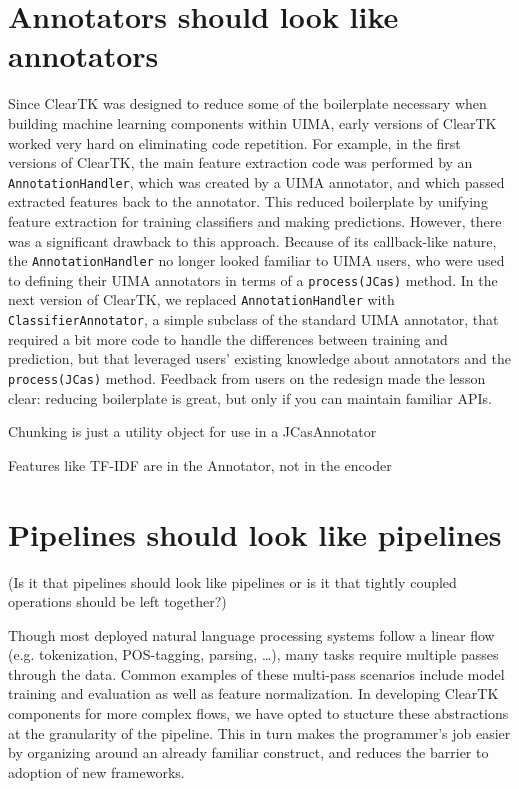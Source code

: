 \documentclass[10pt, a4paper]{article}
\begin{document}
\section{Annotators should look like annotators}
Since ClearTK was designed to reduce some of the boilerplate necessary when building machine learning components within UIMA, early versions of ClearTK worked very hard on eliminating code repetition.
For example, in the first versions of ClearTK, the main feature extraction code was performed by an \texttt{AnnotationHandler}, which was created by a UIMA annotator, and which passed extracted features back to the annotator.
This reduced boilerplate by unifying feature extraction for training classifiers and making predictions.
However, there was a significant drawback to this approach.
Because of its callback-like nature, the \texttt{AnnotationHandler} no longer looked familiar to UIMA users, who were used to defining their UIMA annotators in terms of a \texttt{process(JCas)} method.
In the next version of ClearTK, we replaced \texttt{AnnotationHandler} with \texttt{ClassifierAnnotator}, a simple subclass of the standard UIMA annotator, that required a bit more code to handle the differences between training and prediction, but that leveraged users' existing knowledge about annotators and the \texttt{process(JCas)} method.
Feedback from users on the redesign made the lesson clear: reducing boilerplate is great, but only if you can maintain familiar APIs.

Chunking is just a utility object for use in a JCasAnnotator

Features like TF-IDF are in the Annotator, not in the encoder


\section{Pipelines should look like pipelines}

(Is it that pipelines should look like pipelines or is it that tightly coupled operations should be left together?)

Though most deployed natural language processing systems follow a linear flow (e.g. tokenization, POS-tagging, parsing, \ldots), many tasks require multiple passes through the data.  Common examples of these multi-pass scenarios include model training and evaluation as well as feature normalization.  In developing ClearTK components for more complex flows, we have opted to stucture these abstractions at the granularity of the pipeline.  This in turn makes the programmer's job easier by organizing around an already familiar construct, and reduces the barrier to adoption of new frameworks.
\end{document}
